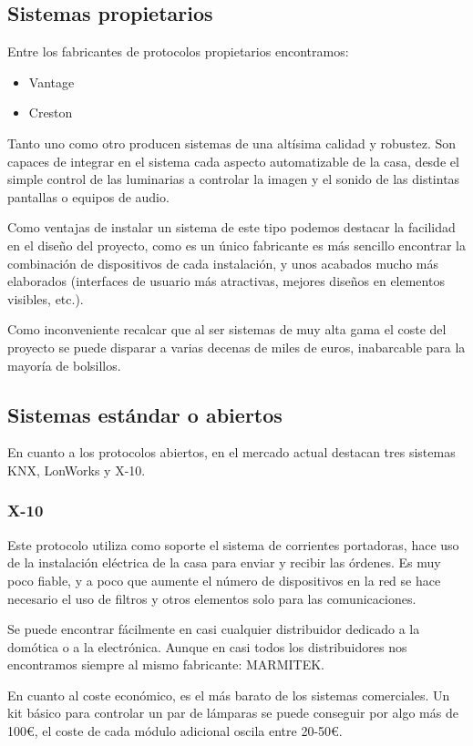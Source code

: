 \subsection{Sistemas propietarios}
Entre los fabricantes de protocolos propietarios encontramos:
\begin{itemize}
	\item Vantage
	\item Creston
\end{itemize}
Tanto uno como otro producen sistemas de una altísima calidad y
robustez. Son capaces de integrar en el sistema cada aspecto automatizable
de la casa, desde el simple control de las luminarias a controlar la imagen y el
sonido de las distintas pantallas o equipos de audio.


Como ventajas de instalar un sistema de este tipo podemos destacar la
facilidad en el diseño del proyecto, como es un único fabricante es m\'as sencillo
encontrar la combinación de dispositivos de cada instalación, y unos acabados
mucho m\'as elaborados (interfaces de usuario m\'as atractivas, mejores diseños
en elementos visibles, etc.).


Como inconveniente recalcar que al ser sistemas de muy alta gama el
coste del proyecto se puede disparar a varias decenas de miles de euros,
inabarcable para la mayoría de bolsillos.

\subsection{Sistemas est\'andar o abiertos}
En cuanto a los protocolos abiertos, en el mercado actual destacan tres
sistemas KNX, LonWorks y X-10.
\subsubsection{X-10}
Este protocolo utiliza como soporte el sistema de corrientes portadoras,
hace uso de la instalación eléctrica de la casa para enviar y recibir las órdenes.
Es muy poco fiable, y a poco que aumente el número de dispositivos en la red
se hace necesario el uso de filtros y otros elementos solo para las
comunicaciones.


Se puede encontrar f\'acilmente en casi cualquier distribuidor dedicado a
la domótica o a la electrónica. Aunque en casi todos los distribuidores nos
encontramos siempre al mismo fabricante: MARMITEK.


En cuanto al coste económico, es el m\'as barato de los sistemas
comerciales. Un kit b\'asico para controlar un par de l\'amparas se puede
conseguir por algo m\'as de 100\euro, el coste de cada módulo adicional oscila entre 20-50\euro.

